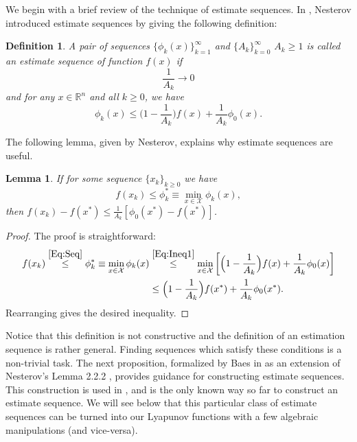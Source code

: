 \documentclass[11pt]{article}
\theoremstyle{plain}
\newtheorem{definition}{Definition}
\newtheorem{lemma}[theorem]{Lemma}
\newcommand{\R}{{\mathbb R}}
\newcommand{\X}{{\mathcal X}}
\begin{document}
We begin with a brief review of the technique of estimate sequences. 
In \cite{Nesterov04}, Nesterov introduced estimate sequences by giving the following definition:
\begin{definition}\cite[2.2.1]{Nesterov04} A pair of sequences $\{\phi_k(x)\}_{k=1}^\infty$ and $\{A_k\}_{k=0}^\infty$ $A_k \geq1$ is called an {\em estimate sequence} of function $f(x)$ if 
\[ \frac{1}{A_k} \rightarrow 0 \]
and for any $x \in \R^n$ and all $k \geq 0$, we have 
\begin{equation}\label{Eq:Ineq1}
\phi_k(x) \leq \Big(1 - \frac{1}{A_k}\Big)f(x) + \frac{1}{A_k}\phi_0(x).
\end{equation}
\end{definition}
\noindent The following lemma, given by Nesterov, explains why estimate sequences are useful.
%
%
\begin{lemma}\label{Lem:Nest2.2.1} \cite[2.2.1]{Nesterov04}
If for some sequence $\{x_k\}_{k\geq0}$ we have 
\begin{equation}\label{Eq:Seq}
f(x_k) \leq \phi_k^\ast \equiv \min_{x \in \X} \phi_k(x),
\end{equation}
then $f(x_k) - f(x^\ast) \leq \frac{1}{A_k} [\phi_0(x^\ast) - f(x^\ast)]$. 
\end{lemma}
%
%
\begin{proof}The proof is straightforward:
\begin{align*}
f(x_k) \overset{\eqref{Eq:Seq}}{\leq} \phi_k^\ast \equiv \min_{x \in \X} \phi_k(x) &\overset{\eqref{Eq:Ineq1}}{\leq}\min_{x \in\X}\left[\Big(1 - \frac{1}{A_k}\Big)f(x) + \frac{1}{A_k}\phi_0(x)\right]\\
&\leq \Big(1 - \frac{1}{A_k}\Big)f(x^\ast) + \frac{1}{A_k}\phi_0(x^\ast).
\end{align*}
Rearranging gives the desired inequality.
\end{proof}
%
%
Notice that this definition is not constructive and the definition of an estimation sequence is rather general. Finding sequences which satisfy these conditions is a non-trivial task. The next proposition, formalized by Baes in \cite{Baes09} as an  extension of Nesterov's Lemma 2.2.2 \cite{Nesterov04}, provides guidance for constructing estimate sequences. This construction is used in \cite{Nesterov04, Nesterov05, Nesterov08, Baes09, Nesterov15, NesterovCond15}, and is the only known way so far to construct an estimate sequence.  We will see below that this particular class of estimate sequences can be turned into our Lyapunov functions with a few algebraic manipulations (and vice-versa).
\end{document}
